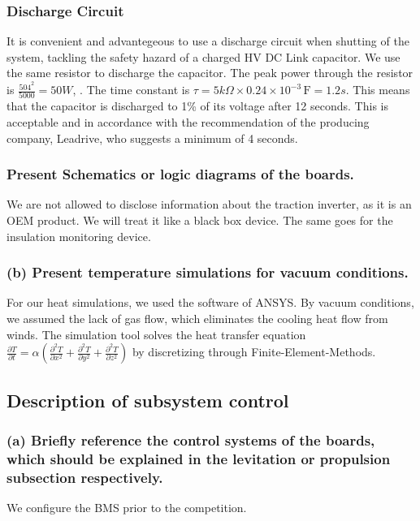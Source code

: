 \subsubsection*{Discharge Circuit}
It is convenient and advantegeous to use a discharge circuit when shutting of the system, tackling the safety hazard of a charged HV DC Link capacitor. We use the same resistor to discharge the capacitor. The peak power through the resistor is \( \frac{504^2}{5000} = 50W \), . The time constant is \( \tau = 5k \Omega \times 0.24 \times 10^{-3} \, \text{F} = 1.2s \). This means that the capacitor is discharged to 1\% of its voltage after 12 seconds. This is acceptable and in accordance with the recommendation of the producing company, Leadrive, who suggests a minimum of 4 seconds.


\subsubsection{Present Schematics or logic diagrams of the boards.}



We are not allowed to disclose information about the traction inverter, as it is an OEM product. We will treat it like a black box device. 
The same goes for the insulation monitoring device.
\subsubsection{(b) Present temperature simulations for vacuum conditions.}
For our heat simulations, we used the software of ANSYS. By vacuum conditions, we assumed the
lack of gas flow, which eliminates the cooling heat flow from winds. The simulation tool solves
the heat transfer equation \( \frac{\partial T}{\partial t} = \alpha \left( \frac{\partial^2 T}{\partial x^2} + \frac{\partial^2 T}{\partial y^2} + \frac{\partial^2 T}{\partial z^2} \right) \)
by discretizing through Finite-Element-Methods.

\subsection{Description of subsystem control}
\subsubsection{(a) Briefly reference the control systems of the boards, which should be explained in the levitation or propulsion subsection respectively.}
We configure the BMS prior to the competition. 

